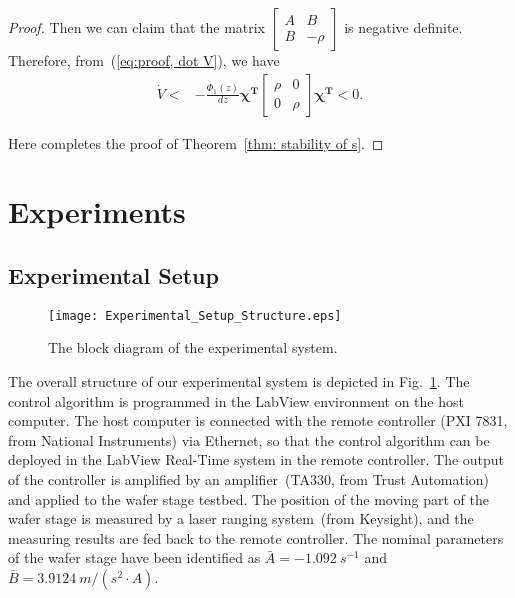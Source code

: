 \documentclass{ifacconf}
\begin{document}
\begin{proof}
Then we can claim that the matrix $\left[\begin{array}{cc}
    A & B \\
    B & -\rho
\end{array}\right]$ is negative definite. Therefore,
from~(\ref{eq:proof, dot V}), we have
\begin{align}
\dot{V}
< &
-\frac{\Phi_1(z)}{dz}\bm{\chi}^{\bm{T}}
\left[
\begin{array}{cc}
     \rho&0  \\
     0& \rho
\end{array}
\right]
\bm{\chi}^{\bm{T}}
< 0.
\end{align}

Here completes the proof of Theorem~\ref{thm: stability of s}.
\end{proof}

\section{Experiments} \label{sec:experiments}
\subsection{Experimental Setup} \label{subsec:experimental setup}

\begin{figure}[http]
  \centering
   \texttt{[image: Experimental\_Setup\_Structure.eps]}%
   \caption{The block diagram of the experimental system.}
   \label{fig:structure_closed_loop}
   \end{figure}

The overall structure of our experimental system is depicted in Fig.~\ref{fig:structure_closed_loop}. The control algorithm is programmed in the LabView environment on the host computer. The host computer is connected with the remote controller (PXI 7831, from National Instruments) via Ethernet, so that the control algorithm can be deployed in the LabView Real-Time system in the remote controller. The output of the controller is amplified by an amplifier~(TA330, from Trust Automation) and applied to the wafer stage testbed. The position of the moving part of the wafer stage is measured by a laser ranging system~(from Keysight), and the measuring results are fed back to the remote controller. The nominal parameters of the wafer stage have been identified as $\bar{A}=-1.092~s^{-1}$ and $\bar{B}=3.9124~m/(s^2\cdot A)$.
\end{document}
